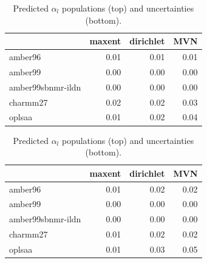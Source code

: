 \documentclass[12pt]{article}
\begin{document}
\begin{table}

\begin{tabular}{lrrr}
\toprule
{} &  maxent &  dirichlet &  MVN \\
\midrule
amber96           &    0.01 &       0.01 & 0.01 \\
amber99           &    0.00 &       0.00 & 0.00 \\
amber99sbnmr-ildn &    0.00 &       0.00 & 0.00 \\
charmm27          &    0.02 &       0.02 & 0.03 \\
oplsaa            &    0.01 &       0.02 & 0.04 \\
\bottomrule
\end{tabular}

\begin{tabular}{lrrr}
\toprule
{} &  maxent &  dirichlet &  MVN \\
\midrule
amber96           &    0.01 &       0.02 & 0.02 \\
amber99           &    0.00 &       0.00 & 0.00 \\
amber99sbnmr-ildn &    0.00 &       0.00 & 0.00 \\
charmm27          &    0.01 &       0.02 & 0.02 \\
oplsaa            &    0.01 &       0.03 & 0.05 \\
\bottomrule
\end{tabular}

\caption{
Predicted $\alpha_l$ populations (top) and uncertainties (bottom).  
}
\end{table}

\clearpage
\end{document}
